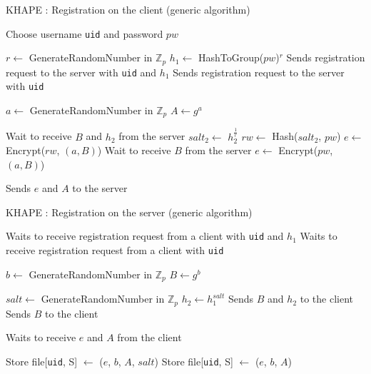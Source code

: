 \documentclass[../report.tex]{subfiles}
\begin{document}
\begin{algorithm}
\caption{KHAPE : Registration on the client (generic algorithm)}
\label{alg:register_client}
\begin{algorithmic}
\Require Choose username \verb|uid| and password $pw$

    \State $r \gets$ GenerateRandomNumber in $\mathbb{Z}_p$
    \State $h_1 \gets$ HashToGroup($pw$)$^r$
    \State Sends registration request to the server with \verb|uid| and $h_1$
\Else
    \State Sends registration request to the server with \verb|uid|
\EndIf

\State $a \gets$ GenerateRandomNumber in $\mathbb{Z}_p$
\State $A \gets g^a$

    \State Wait to receive $B$ and $h_2$ from the server
    \State $salt_2 \gets$ $h_2^{\frac{1}{r}}$
    \State $rw \gets$ Hash($salt_2$, $pw$)
    \State $e \gets$ Encrypt($rw$, $(a, B)$)
\Else
    \State Wait to receive $B$ from the server
    \State $e \gets$ Encrypt($pw$, $(a, B)$)
\EndIf

\State Sends $e$ and $A$ to the server


\end{algorithmic}
\end{algorithm}

\begin{algorithm}
\caption{KHAPE : Registration on the server (generic algorithm)}
\label{alg:register_server}
\begin{algorithmic}
\Require 

    \State Waits to receive registration request from a client with \verb|uid| and $h_1$
\Else
    \State Waits to receive registration request from a client with \verb|uid|
\EndIf

\State $b \gets$ GenerateRandomNumber in $\mathbb{Z}_p$
\State $B \gets g^b$

    \State $salt \gets$ GenerateRandomNumber in $\mathbb{Z}_p$
    \State $h_2 \gets h_1^{salt}$    
    \State Sends $B$ and $h_2$ to the client
\Else
    \State Sends $B$ to the client
\EndIf

\State Waits to receive $e$ and $A$ from the client

    \State Store file[\verb|uid|, S] $\gets$ ($e$, $b$, $A$, $salt$) %
\Else
    \State Store file[\verb|uid|, S] $\gets$ ($e$, $b$, $A$) %
\EndIf

\end{algorithmic}
\end{algorithm}
\end{document}
